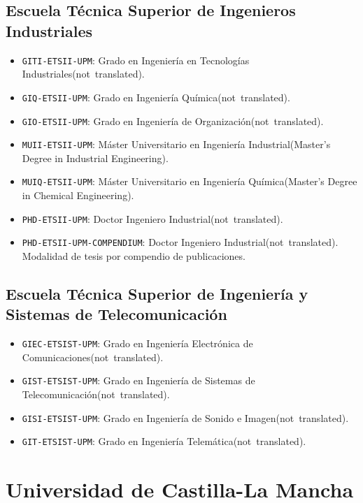 \subsection {Escuela Técnica Superior de Ingenieros Industriales}
\begin {itemize}
\item \texttt {GITI-ETSII-UPM}: Grado en Ingeniería en Tecnologías Industriales\nobreakspace {}(\mbox {not translated}).
\item \texttt {GIQ-ETSII-UPM}: Grado en Ingeniería Química\nobreakspace {}(\mbox {not translated}).
\item \texttt {GIO-ETSII-UPM}: Grado en Ingeniería de Organización\nobreakspace {}(\mbox {not translated}).
\item \texttt {MUII-ETSII-UPM}: Máster Universitario en Ingeniería Industrial\nobreakspace {}(Master's Degree in Industrial Engineering).
\item \texttt {MUIQ-ETSII-UPM}: Máster Universitario en Ingeniería Química\nobreakspace {}(Master's Degree in Chemical Engineering).
\item \texttt {PHD-ETSII-UPM}: Doctor Ingeniero Industrial\nobreakspace {}(\mbox {not translated}).
\item \texttt {PHD-ETSII-UPM-COMPENDIUM}: Doctor Ingeniero Industrial\nobreakspace {}(\mbox {not translated}). Modalidad de tesis por compendio de publicaciones.
\end {itemize}
\subsection {Escuela Técnica Superior de Ingeniería y Sistemas de Telecomunicación}
\begin {itemize}
\item \texttt {GIEC-ETSIST-UPM}: Grado en Ingeniería Electrónica de Comunicaciones\nobreakspace {}(\mbox {not translated}).
\item \texttt {GIST-ETSIST-UPM}: Grado en Ingeniería de Sistemas de Telecomunicación\nobreakspace {}(\mbox {not translated}).
\item \texttt {GISI-ETSIST-UPM}: Grado en Ingeniería de Sonido e Imagen\nobreakspace {}(\mbox {not translated}).
\item \texttt {GIT-ETSIST-UPM}: Grado en Ingeniería Telemática\nobreakspace {}(\mbox {not translated}).
\end {itemize}
\section {Universidad de Castilla-La Mancha}
